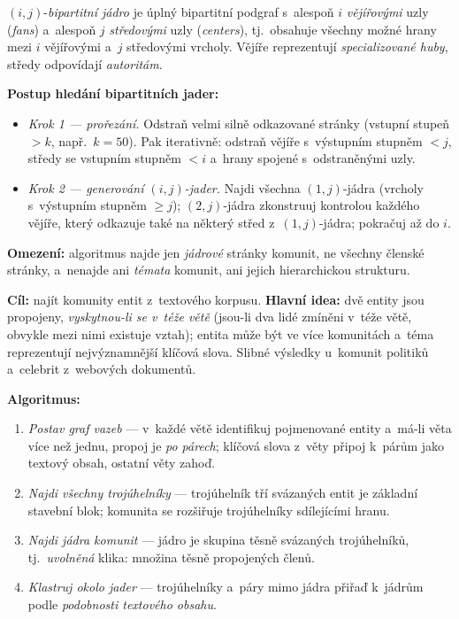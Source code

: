 \documentclass[11pt,a4paper]{article}
\theoremstyle{definition}
\begin{document}
\begin{defbox}
$(i,j)$-\emph{bipartitní jádro} je úplný bipartitní podgraf s~alespoň $i$ \emph{vějířovými}
uzly (\emph{fans}) a~alespoň $j$ \emph{středovými} uzly (\emph{centers}), tj.\ obsahuje všechny
možné hrany mezi $i$ vějířovými a~$j$ středovými vrcholy. Vějíře reprezentují
\emph{specializované huby}, středy odpovídají \emph{autoritám}.

\textbf{Postup hledání bipartitních jader:}
\begin{itemize}
\item \emph{Krok 1 --- prořezání.} Odstraň velmi silně odkazované stránky (vstupní stupeň $>k$,
      např.\ $k=50$). Pak iterativně: odstraň vějíře s~výstupním stupněm $<j$, středy se
      vstupním stupněm $<i$ a~hrany spojené s~odstraněnými uzly.
\item \emph{Krok 2 --- generování $(i,j)$-jader.} Najdi všechna $(1,j)$-jádra (vrcholy
      s~výstupním stupněm $\ge j$); $(2,j)$-jádra zkonstruuj kontrolou každého vějíře, který
      odkazuje také na některý střed z~$(1,j)$-jádra; pokračuj až do $i$.
\end{itemize}
\textbf{Omezení:} algoritmus najde jen \emph{jádrové} stránky komunit, ne všechny členské
stránky, a~nenajde ani \emph{témata} komunit, ani jejich hierarchickou strukturu.
\end{defbox}

\begin{defbox}
\textbf{Cíl:} najít komunity entit z~textového korpusu. \textbf{Hlavní idea:} dvě entity jsou
propojeny, \emph{vyskytnou-li se v~téže větě} (jsou-li dva lidé zmíněni v~téže větě, obvykle mezi
nimi existuje vztah); entita může být ve více komunitách a~téma reprezentují nejvýznamnější
klíčová slova. Slibné výsledky u~komunit politiků a~celebrit z~webových dokumentů.

\textbf{Algoritmus:}
\begin{enumerate}
\item \emph{Postav graf vazeb} --- v~každé větě identifikuj pojmenované entity a~má-li věta více
      než jednu, propoj je \emph{po párech}; klíčová slova z~věty připoj k~párům jako textový
      obsah, ostatní věty zahoď.
\item \emph{Najdi všechny trojúhelníky} --- trojúhelník tří svázaných entit je základní stavební
      blok; komunita se rozšiřuje trojúhelníky sdílejícími hranu.
\item \emph{Najdi jádra komunit} --- jádro je skupina těsně svázaných trojúhelníků, tj.\
      \emph{uvolněná} klika: množina těsně propojených členů.
\item \emph{Klastruj okolo jader} --- trojúhelníky a~páry mimo jádra přiřaď k~jádrům podle
      \emph{podobnosti textového obsahu}.
\end{enumerate}
\end{defbox}
\end{document}
